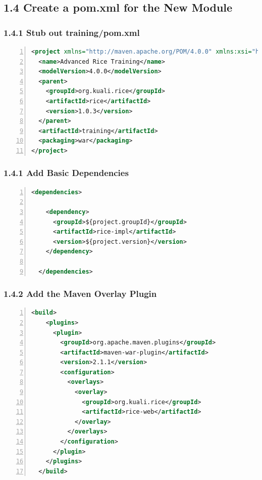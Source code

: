 \subsection*{1.4 Create a pom.xml for the New Module}
\subsubsection*{1.4.1 Stub out training/pom.xml}
\begin{lstlisting}[numbers=left,language=xml,basicstyle=\scriptsize,backgroundcolor=\color{ubergray},caption={training/pom.xml},frame=single,breaklines=true]
<project xmlns="http://maven.apache.org/POM/4.0.0" xmlns:xsi="http://www.w3.org/2001/XMLSchema-instance" xsi:schemaLocation="http://maven.apache.org/POM/4.0.0 http://maven.apache.org/maven-v4_0_0.xsd">
  <name>Advanced Rice Training</name>
  <modelVersion>4.0.0</modelVersion>
  <parent>
    <groupId>org.kuali.rice</groupId>
    <artifactId>rice</artifactId>
    <version>1.0.3</version>
  </parent>
  <artifactId>training</artifactId>
  <packaging>war</packaging>
</project>
\end{lstlisting}

\subsubsection*{1.4.1 Add Basic Dependencies}
\begin{lstlisting}[numbers=left,language=xml,basicstyle=\scriptsize,backgroundcolor=\color{ubergray},caption={training/pom.xml},frame=single,breaklines=true]
  <dependencies>

    <dependency>
      <groupId>${project.groupId}</groupId>
      <artifactId>rice-impl</artifactId>
      <version>${project.version}</version>
    </dependency>

  </dependencies>  
\end{lstlisting}

\subsubsection*{1.4.2 Add the Maven Overlay Plugin}
\begin{lstlisting}[numbers=left,language=xml,basicstyle=\scriptsize,backgroundcolor=\color{ubergray},caption={training/pom.xml},frame=single,breaklines=true]
  <build>
    <plugins>
      <plugin>
        <groupId>org.apache.maven.plugins</groupId>
        <artifactId>maven-war-plugin</artifactId>
        <version>2.1.1</version>
        <configuration>
          <overlays>
            <overlay>
              <groupId>org.kuali.rice</groupId>
              <artifactId>rice-web</artifactId>
            </overlay>
          </overlays>
        </configuration>
      </plugin>
    </plugins>
  </build>
\end{lstlisting}

